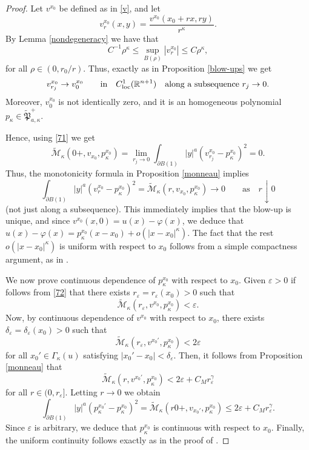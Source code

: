 \documentclass[11pt]{amsart}
\theoremstyle{plain}
\numberwithin{equation}{section}
\begin{document}
\begin{proof}
Let $v^{x_0}$ be defined as in \eqref{v}, and let
\[v_r^{x_0}(x,y)=\frac{v^{x_0}(x_0+rx,ry)}{r^\kappa}.\]
By Lemma \ref{nondegeneracy} we have that
\[C^{-1}\rho^\kappa\leq \sup_{B(\rho)}|v_r^{x_0}|\leq C\rho^\kappa,\]
for all $\rho\in (0,r_0/r)$.
Thus, exactly as in Proposition \ref{blow-ups} we get
\begin{equation}\label{71}
v_{r_j}^{x_0}\rightarrow v_0^{x_0}\qquad\textrm{in}\quad C^1_{\rm loc}({\mathbb R}^{n+1})\quad \textrm{along a subsequence}\ r_j\to0.
\end{equation}
Moreover, $v_0^{x_0}$ is not identically zero, and it is an homogeneous polynomial $p_\kappa\in\tilde{\mathfrak P}_{a,\kappa}^+$.

Hence, using \eqref{71} we get
\[\tilde{\mathcal M}_\kappa(0+,v_{x_0},p_\kappa^{x_0}) =\lim_{r_j\to0}\int_{\partial{B(1)}}|y|^a(v_{r_j}^{x_0}-p_\kappa^{x_0})^2=0.\]
Thus, the monotonicity formula in Proposition \ref{monneau} implies
\begin{equation}\label{72}
\int_{\partial{B(1)}}|y|^a(v_r^{x_0}-p_\kappa^{x_0})^2= \tilde{\mathcal M}_\kappa(r,v_{x_0},p_\kappa^{x_0}) \longrightarrow0\qquad \textrm{as}\quad r\downarrow0
\end{equation}
(not just along a subsequence).
This immediately implies that the blow-up is unique, and since $v^{x_0}(x,0)=u(x)-\varphi(x)$, we deduce that $u(x)-\varphi(x)=p_\kappa^{x_0}(x-x_0)+o(|x-x_0|^\kappa)$.
The fact that the rest $o(|x-x_0|^\kappa)$ is uniform with respect to $x_0$ follows from a simple compactness argument, as in \cite[Lemma 7.3 and Proposition 7.7]{PSU}.

We now prove continuous dependence of $p_\kappa^{x_0}$ with respect to $x_0$.
Given $\varepsilon>0$ if follows from \eqref{72} that there exists $r_\varepsilon=r_\varepsilon(x_0)>0$ such that
\[\tilde{\mathcal M}_\kappa(r_\varepsilon,v^{x_0},p_\kappa^{x_0})<\varepsilon.\]
Now, by continuous dependence of $v^{x_0}$ with respect to $x_0$, there exists $\delta_\varepsilon=\delta_\varepsilon(x_0)>0$ such that
\[\tilde{\mathcal M}_\kappa(r_\varepsilon,v^{x_0'},p_\kappa^{x_0})<2\varepsilon\]
for all $x_0'\in \Gamma_\kappa(u)$ satisfying $|x_0'-x_0|<\delta_\varepsilon$.
Then, it follows from Proposition \ref{monneau} that
\[\tilde{\mathcal M}_\kappa(r,v^{x_0'},p_\kappa^{x_0})<2\varepsilon+C_Mr_\varepsilon^\gamma\]
for all $r\in(0,r_\varepsilon]$.
Letting $r\to0$ we obtain
\[\int_{\partial{B(1)}}|y|^a(p_\kappa^{x_0'}-p_\kappa^{x_0})^2=\tilde{\mathcal M}_\kappa(r0+,v_{x_0'},p_\kappa^{x_0}) \leq 2\varepsilon+C_Mr_\varepsilon^\gamma.\]
Since $\varepsilon$ is arbitrary, we deduce that $p_\kappa^{x_0}$ is continuous with respect to $x_0$.
Finally, the uniform continuity follows exactly as in the proof of \cite[Theorem 2.8.4]{GP}.
\end{proof}
\end{document}
